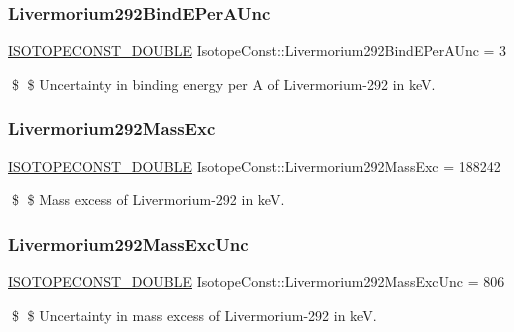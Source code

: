 \subsubsection{\texorpdfstring{Livermorium292\+Bind\+E\+Per\+A\+Unc}{Livermorium292BindEPerAUnc}}
{\footnotesize\ttfamily \mbox{\hyperlink{group___isotope_const-_macros_ga8f45a7272ce02c0b4c65c44636ed719a}{I\+S\+O\+T\+O\+P\+E\+C\+O\+N\+S\+T\+\_\+\+D\+O\+U\+B\+LE}} Isotope\+Const\+::\+Livermorium292\+Bind\+E\+Per\+A\+Unc = 3}

\$ \$ Uncertainty in binding energy per A of Livermorium-\/292 in keV. \mbox{\label{group___isotope_const-_livermorium-_lv292_ga80b8b4c258ce8474ae72d65b348e8495}} 
\subsubsection{\texorpdfstring{Livermorium292\+Mass\+Exc}{Livermorium292MassExc}}
{\footnotesize\ttfamily \mbox{\hyperlink{group___isotope_const-_macros_ga8f45a7272ce02c0b4c65c44636ed719a}{I\+S\+O\+T\+O\+P\+E\+C\+O\+N\+S\+T\+\_\+\+D\+O\+U\+B\+LE}} Isotope\+Const\+::\+Livermorium292\+Mass\+Exc = 188242}

\$ \$ Mass excess of Livermorium-\/292 in keV. \mbox{\label{group___isotope_const-_livermorium-_lv292_ga2ba40f9cf0fa19c453a9a75420d63a63}} 
\subsubsection{\texorpdfstring{Livermorium292\+Mass\+Exc\+Unc}{Livermorium292MassExcUnc}}
{\footnotesize\ttfamily \mbox{\hyperlink{group___isotope_const-_macros_ga8f45a7272ce02c0b4c65c44636ed719a}{I\+S\+O\+T\+O\+P\+E\+C\+O\+N\+S\+T\+\_\+\+D\+O\+U\+B\+LE}} Isotope\+Const\+::\+Livermorium292\+Mass\+Exc\+Unc = 806}

\$ \$ Uncertainty in mass excess of Livermorium-\/292 in keV. \mbox{\label{group___isotope_const-_livermorium-_lv292_ga9e1694d2075b9dbede2fdb6b9eb3dbd0}} 
